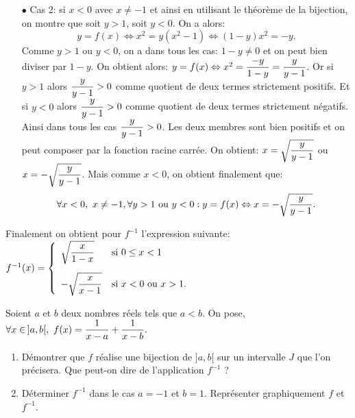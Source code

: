 \documentclass[a4paper, 11pt,reqno]{article}
\begin{document}
\begin{correction}
\begin{enumerate}
\begin{itemize}
			      \item[$\bullet$] Cas 2: si $x<0$ avec $x\not= -1$ et ainsi en utilisant le th\'eor\`{e}me de la bijection, on montre que soit $y>1$, soit $y<0$. On a alors:
			            $$y=f(x)\Leftrightarrow x^2=y(x^2-1)\Leftrightarrow (1-y)x^2=-y.$$
			            Comme $y>1$ ou $y<0$, on a dans tous les cas: $1-y\not= 0$ et on peut bien diviser par $1-y$. On obtient alors: $y=f(x)\Leftrightarrow x^2=\displaystyle\frac{-y}{1-y}=\displaystyle\frac{y}{y-1}$. Or si $y>1$ alors $\displaystyle\frac{y}{y-1}>0$ comme quotient de deux termes strictement positifs. Et si $y<0$ alors $\displaystyle\frac{y}{y-1}>0$ comme quotient de deux termes strictement n\'egatifs. Ainsi dans tous les cas $\displaystyle\frac{y}{y-1}>0$. Les deux membres sont bien positifs et on peut composer par la fonction racine carr\'ee. On obtient: $x=\displaystyle\sqrt{\frac{y}{y-1}}$ ou $x=-\displaystyle\sqrt{\frac{y}{y-1}}$. Mais comme $x< 0$, on obtient finalement que:
			            $$\forall x< 0,\ x\not= -1,\forall y>1\ \hbox{ou}\ y<0: y=f(x)\Leftrightarrow x=-\displaystyle\sqrt{\frac{y}{y-1}}.$$
		      \end{itemize}
		      Finalement on obtient pour $f^{-1}$ l'expression suivante:
		      $f^{-1}(x)=\left\lbrace\begin{array}{ll}
				      \ddp\sqrt{\frac{x}{1-x}}  & \hbox{si}\ 0\leq x <1\vsec      \\
				      -\ddp\sqrt{\frac{x}{x-1}} & \hbox{si}\ x<0\ \hbox{ou}\ x>1.
			      \end{array}
			      \right.$
	\end{enumerate}
\end{correction}
\begin{exercice}  \;
	Soient $a$ et $b$ deux nombres r\'eels tels que $a<b$. On pose, $\forall x\in \, \rbrack a,b\lbrack,\ f(x)=\ddp\frac{1}{x-a}+\ddp\frac{1}{x-b}.$
	\begin{enumerate}
		\item D\'emontrer que $f$ r\'ealise une bijection de $\rbrack a,b\lbrack$ sur un intervalle $J$ que l'on pr\'ecisera. Que peut-on dire de l'application $f^{-1}$ ?
		\item D\'eterminer $f^{-1}$ dans le cas $a=-1$ et $b=1$. Repr\'esenter graphiquement $f$ et $f^{-1}$.
	\end{enumerate}
\end{exercice}
\end{document}
